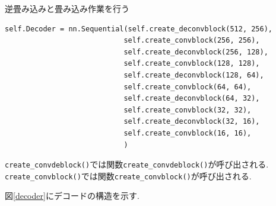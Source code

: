 \documentclass[dvipdfmx]{jsarticle}
\newcommand{\Add}[1]{\textcolor{red}{#1}}
\begin{document}
\begin{itemize}
    逆畳み込みと畳み込み作業を行う
    \begin{lstlisting}
self.Decoder = nn.Sequential(self.create_deconvblock(512, 256),  
                            self.create_convblock(256, 256), 
                            self.create_deconvblock(256, 128),  
                            self.create_convblock(128, 128), 
                            self.create_deconvblock(128, 64),  
                            self.create_convblock(64, 64), 
                            self.create_deconvblock(64, 32),   
                            self.create_convblock(32, 32), 
                            self.create_deconvblock(32, 16),  
                            self.create_convblock(16, 16), 
                            )
    \end{lstlisting}

    \verb|create_convdeblock()|では関数\verb|create_convdeblock()|が呼び出される.
    \verb|create_convblock()|では関数\verb|create_convblock()|が呼び出される.
    
    図\ref{decoder}にデコードの構造を示す.

    

\end{itemize}
\end{document}
